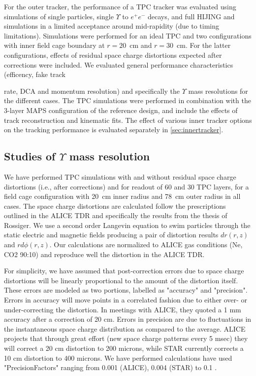 For the outer tracker, the performance of a TPC tracker was evaluated using \geant simulations of single particles, single $\Upsilon$ to $e^+ e^-$
decays, and full HIJING and \geant simulations in a limited acceptance around mid-rapidity (due to timing limitations). Simulations were performed
for an ideal TPC and two configurations with inner field cage boundary at $r=20$~cm and $r=30$~cm. For the latter configurations, effects of 
residual space charge distortions expected after corrections were included. We evaluated general performance characteristics (efficency, fake track

rate, DCA and momentum resolution) and specifically the $\Upsilon$ mass resolutions for the different cases. The TPC simulations were performed
in combination with the 3-layer MAPS configuration of the reference design, and include the effects of track reconstruction and kinematic fits. 
The effect of various inner tracker options on the tracking performance is evaluated separately in \ref{sec:innertracker}.

\subsection{Studies of $\Upsilon$ mass resolution}

We have performed TPC simulations with and without residual space charge distortions
(i.e., after corrections)  and for readout of 60 and 30 TPC layers, for a field cage configuration with 20~cm inner radius and 78~cm outer radius 
in all cases. The space charge distortions are calculated follow the prescriptions outlined in the ALICE TDR and 
specifically the results from the thesis of Rossiger.  We use a second order Langevin equation to 
swim particles through the static electric and magnetic fields producing a pair of distortion results $dr(r,z)$ and $rd{\phi}(r,z)$.  
Our calculations are normalized to ALICE gas conditions (Ne, CO2 90:10) and reproduce well the distortion in the ALICE TDR.  

For simplicity, we have assumed that post-correction errors due to space charge distortions will be linearly proportional to the amount of the 
distortion itself.  These errors are modeled as two portions, labelled as "accuracy" and "precision".  Errors in accuracy will move points 
in a correlated fashion due to either over- or under-correcting the distortion.  In meetings with ALICE, they quoted a 1 mm accuracy 
after a correction of 20 cm.  Errors in precision are due to fluctuations in the instantaneous space charge distribution as compared to the average.  
ALICE projects that through great effort (new space charge patterns every 5 msec) they will correct a 20 cm distortion to 200 microns,
 while STAR currently corrects a 10 cm distortion to 400 microns.  We have performed calculations have used "PrecisionFactors" ranging 
from  0.001 (ALICE), 0.004 (STAR) to 0.1 .

